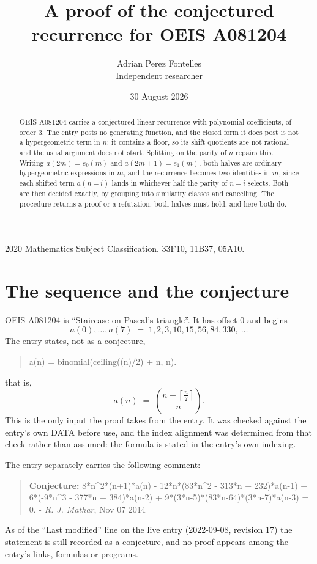 \documentclass[11pt,a4paper]{article}
\title{A proof of the conjectured recurrence for OEIS A081204}
\author{Adrian Perez Fontelles\\ \small Independent researcher}
\date{30 August 2026}
\theoremstyle{plain}
\theoremstyle{definition}
\begin{document}
\maketitle

\begin{abstract}
OEIS A081204 carries a conjectured linear recurrence with polynomial coefficients, of
order 3. The entry posts no generating function, and the closed form it does post
is not a hypergeometric term in $n$: it contains a floor, so its shift quotients are not
rational and the usual argument does not start. Splitting on the parity of $n$ repairs
this. Writing $a(2m)=e_{0}(m)$ and $a(2m+1)=e_{1}(m)$, both halves are ordinary
hypergeometric expressions in $m$, and the recurrence becomes two identities in $m$, since
each shifted term $a(n-i)$ lands in whichever half the parity of $n-i$ selects. Both are
then decided exactly, by grouping into similarity classes and cancelling. The procedure
returns a proof or a refutation; both halves must hold, and here both do.
\end{abstract}

\noindent\small 2020 Mathematics Subject Classification. 33F10, 11B37, 05A10.\normalsize

\section{The sequence and the conjecture}

OEIS A081204 is ``Staircase on Pascal's triangle''. It has offset $0$ and begins
\[
a(0),\dots,a(7)\;=\;1, 2, 3, 10, 15, 56, 84, 330,\ \dots
\]
The entry states, not as a conjecture,
\begin{quote}\small
a(n) = binomial(ceiling((n)/2) + n, n).
\end{quote}
that is,
\begin{equation}\label{eq:cf}
a(n)\;=\;{\binom{n + \left\lceil{\frac{n}{2}}\right\rceil}{n}} .
\end{equation}
This is the only input the proof takes from the entry. It was checked against the entry's
own DATA before use, and the index alignment was determined from that check rather than
assumed: the formula is stated in the entry's own indexing.

The entry separately carries the following comment:
\begin{quote}\small
\textbf{Conjecture:} 8*n\^{}2*(n+1)*a(n) - 12*n*(83*n\^{}2 - 313*n + 232)*a(n-1) + 6*(-9*n\^{}3 - 377*n + 384)*a(n-2) + 9*(3*n-5)*(83*n-64)*(3*n-7)*a(n-3) = 0. - \emph{R. J. Mathar}, Nov 07 2014
\end{quote}
As of the ``Last modified'' line on the live entry (2022-09-08, revision 17) the
statement is still recorded as a conjecture, and no proof appears among the entry's links,
formulas or programs.
\end{document}

